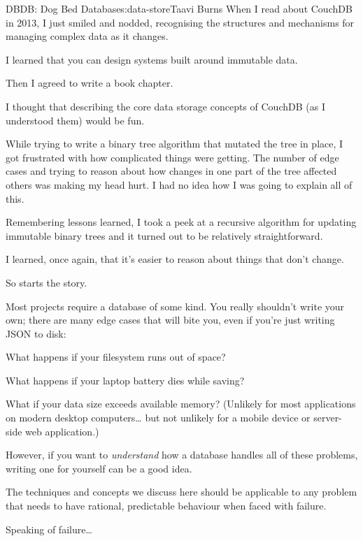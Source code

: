 \begin{aosachapter}{DBDB: Dog Bed Database}{s:data-store}{Taavi Burns}
When I read about CouchDB in 2013, I just smiled and nodded, recognising
the structures and mechanisms for managing complex data as it changes.

I learned that you can design systems built around immutable data.

Then I agreed to write a book chapter.

I thought that describing the core data storage concepts of CouchDB (as
I understood them) would be fun.

While trying to write a binary tree algorithm that mutated the tree in
place, I got frustrated with how complicated things were getting. The
number of edge cases and trying to reason about how changes in one part
of the tree affected others was making my head hurt. I had no idea how I
was going to explain all of this.

Remembering lessons learned, I took a peek at a recursive algorithm for
updating immutable binary trees and it turned out to be relatively
straightforward.

I learned, once again, that it's easier to reason about things that
don't change.

So starts the story.

\label{why-is-it-interesting}

Most projects require a database of some kind. You really shouldn't
write your own; there are many edge cases that will bite you, even if
you're just writing JSON to disk:

\begin{aosaitemize}

\item
  What happens if your filesystem runs out of space?
\item
  What happens if your laptop battery dies while saving?
\item
  What if your data size exceeds available memory? (Unlikely for most
  applications on modern desktop computers\ldots{} but not unlikely for
  a mobile device or server-side web application.)
\end{aosaitemize}

However, if you want to \emph{understand} how a database handles all of
these problems, writing one for yourself can be a good idea.

The techniques and concepts we discuss here should be applicable to any
problem that needs to have rational, predictable behaviour when faced
with failure.

Speaking of failure\ldots{}


\end{aosachapter}
